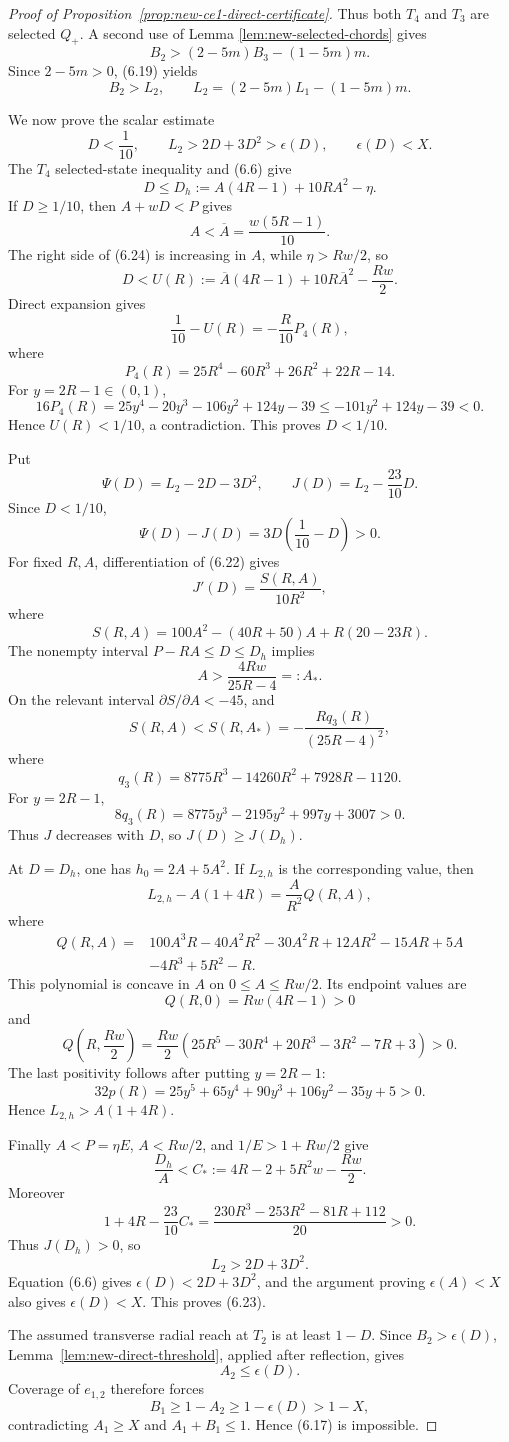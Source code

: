 \begin{proof}[Proof of Proposition~\ref{prop:new-ce1-direct-certificate}]
Thus both $T_4$ and $T_3$ are selected $Q_+$.  A second use of Lemma
\ref{lem:new-selected-chords} gives
\[
 B_2>(2-5m)B_3-(1-5m)m.
\]
Since $2-5m>0$, (6.19) yields
\[
 \boxed{
 B_2>L_2,
 \qquad
 L_2=(2-5m)L_1-(1-5m)m.
 }
 \tag{6.22}
\]

We now prove the scalar estimate
\[
 \boxed{
 D<\frac1{10},
 \qquad
 L_2>2D+3D^2>\epsilon(D),
 \qquad
 \epsilon(D)<X.
 }
 \tag{6.23}
\]
The $T_4$ selected-state inequality and (6.6) give
\[
 D\le D_h:=A(4R-1)+10RA^2-\eta.
 \tag{6.24}
\]
If $D\ge1/10$, then $A+wD<P$ gives
\[
 A<\overline A=\frac{w(5R-1)}{10}.
\]
The right side of (6.24) is increasing in $A$, while $\eta>Rw/2$, so
\[
 D<U(R):=\overline A(4R-1)+10R\overline A^2-\frac{Rw}{2}.
\]
Direct expansion gives
\[
 \frac1{10}-U(R)=-\frac R{10}P_4(R),
\]
where
\[
 P_4(R)=25R^4-60R^3+26R^2+22R-14.
\]
For $y=2R-1\in(0,1)$,
\[
 16P_4(R)
 =25y^4-20y^3-106y^2+124y-39
 \le-101y^2+124y-39<0.
\]
Hence $U(R)<1/10$, a contradiction.  This proves $D<1/10$.

Put
\[
 \Psi(D)=L_2-2D-3D^2,
 \qquad
 J(D)=L_2-\frac{23}{10}D.
\]
Since $D<1/10$,
\[
 \Psi(D)-J(D)=3D\left(\frac1{10}-D\right)>0.
\]
For fixed $R,A$, differentiation of (6.22) gives
\[
 J'(D)=\frac{S(R,A)}{10R^2},
\]
where
\[
 S(R,A)=100A^2-(40R+50)A+R(20-23R).
\]
The nonempty interval $P-RA\le D\le D_h$ implies
\[
 A>\frac{4Rw}{25R-4}=:A_*.
\]
On the relevant interval $\partial S/\partial A<-45$, and
\[
 S(R,A)<S(R,A_*)
 =-\frac{Rq_3(R)}{(25R-4)^2},
\]
where
\[
 q_3(R)=8775R^3-14260R^2+7928R-1120.
\]
For $y=2R-1$,
\[
 8q_3(R)=8775y^3-2195y^2+997y+3007>0.
\]
Thus $J$ decreases with $D$, so $J(D)\ge J(D_h)$.

At $D=D_h$, one has $h_0=2A+5A^2$.  If $L_{2,h}$ is the corresponding value,
then
\[
 L_{2,h}-A(1+4R)=\frac{A}{R^2}Q(R,A),
\]
where
\begin{align*}
Q(R,A)={}&100A^3R-40A^2R^2-30A^2R+12AR^2-15AR+5A\\
&-4R^3+5R^2-R.
\end{align*}
This polynomial is concave in $A$ on $0\le A\le Rw/2$.  Its endpoint values
are
\[
 Q(R,0)=Rw(4R-1)>0
\]
and
\[
 Q\left(R,\frac{Rw}{2}\right)
 =\frac{Rw}{2}
 (25R^5-30R^4+20R^3-3R^2-7R+3)>0.
\]
The last positivity follows after putting $y=2R-1$:
\[
32p(R)=25y^5+65y^4+90y^3+106y^2-35y+5>0.
\]
Hence $L_{2,h}>A(1+4R)$.

Finally $A<P=\eta E$, $A<Rw/2$, and $1/E>1+Rw/2$ give
\[
 \frac{D_h}{A}
 <C_*:=4R-2+5R^2w-\frac{Rw}{2}.
\]
Moreover
\[
 1+4R-\frac{23}{10}C_*
 =\frac{230R^3-253R^2-81R+112}{20}>0.
\]
Thus $J(D_h)>0$, so
\[
 L_2>2D+3D^2.
\]
Equation (6.6) gives $\epsilon(D)<2D+3D^2$, and the argument proving
$\epsilon(A)<X$ also gives $\epsilon(D)<X$.  This proves (6.23).

The assumed transverse radial reach at $T_2$ is at least $1-D$.  Since
$B_2>\epsilon(D)$, Lemma~\ref{lem:new-direct-threshold}, applied after
reflection, gives
\[
 A_2\le\epsilon(D).
\]
Coverage of $e_{1,2}$ therefore forces
\[
 B_1\ge1-A_2\ge1-\epsilon(D)>1-X,
\]
contradicting $A_1\ge X$ and $A_1+B_1\le1$.  Hence (6.17) is impossible.
\end{proof}

